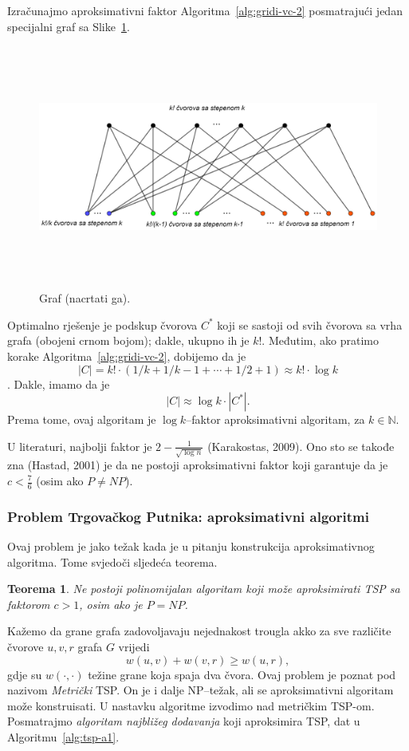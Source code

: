 \documentclass[a4paper, utf8, 11pt, colorlinks]{article}
\newtheorem{thm}{Teorema}
\begin{document}
  \noindent Izračunajmo aproksimativni faktor Algoritma~\ref{alg:gridi-vc-2} posmatrajući jedan specijalni graf sa Slike~\ref{vertex-cover}. 
  
  
  \begin{figure}
  	\centering
  	\includegraphics[width=120mm,height=80mm]{vc-2-example.eps}
  	\caption{Graf (nacrtati ga).} 
  	\label{vertex-cover}
 
  \end{figure}
  
  Optimalno rješenje je podskup čvorova $C^*$ koji se sastoji od svih čvorova sa vrha grafa (obojeni crnom bojom); dakle, ukupno ih je $k!$. Međutim, ako pratimo korake Algoritma~\ref{alg:gridi-vc-2}, dobijemo 
  da je $$|C| = k!\cdot( 1/k + 1/k-1 + \cdots + 1/2 + 1) \approx k! \cdot \log k$$. 
  Dakle, imamo da je
  $$   |C| \approx \log k \cdot |C^*|.$$ Prema tome, ovaj algoritam je $\log k$--faktor aproksimativni algoritam, za $k \in \mathbb{N}$. 
  
  \noindent U literaturi, najbolji faktor je $2 - \frac{1}{\sqrt{\log n}}$ (Karakostas, 2009).
  Ono sto se takođe zna (Hastad, 2001) je da ne postoji aproksimativni faktor 
  koji garantuje da je $c < \frac{7}{6}$ (osim ako $P \neq NP$). 
  
  \subsubsection{Problem Trgovačkog Putnika: aproksimativni algoritmi}
  
  Ovaj problem je jako težak kada je u pitanju konstrukcija aproksimativnog algoritma. Tome svjedoči sljedeća teorema.
 \begin{thm}
    Ne postoji polinomijalan algoritam koji može aproksimirati TSP sa faktorom $c > 1$, osim ako je $P = NP$. 
\end{thm}
  Kažemo da grane grafa zadovoljavaju nejednakost trougla akko za sve različite čvorove $u,v, r$ grafa $G$ vrijedi
  $$ w(u,v) + w(v,r) \geq w(u,r),$$
  gdje su $w(\cdot, \cdot)$ težine grane koja spaja dva čvora. Ovaj problem je poznat 
  pod nazivom \emph{Metrički} TSP. On je i dalje NP--težak, ali se aproksimativni algoritam može konstruisati.  U nastavku algoritme izvodimo nad metričkim TSP-om. Posmatrajmo \emph{algoritam najbližeg dodavanja} koji aproksimira TSP, dat u Algoritmu~\ref{alg:tsp-a1}. 
  
\end{document}
